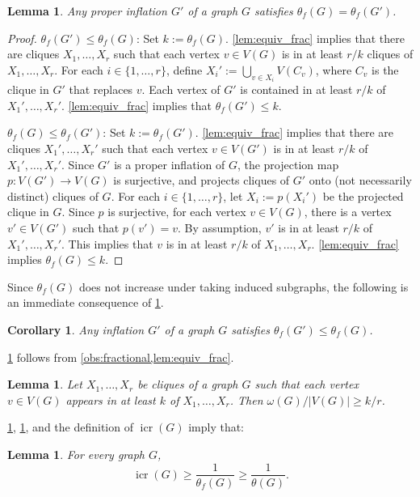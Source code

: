 \documentclass[11pt]{article}
\numberwithin{equation}{section}
\theoremstyle{plain}
\newtheorem{lem}[equation]{Lemma}
\newtheorem{cor}[equation]{Corollary}
\theoremstyle{definition}
\renewcommand{\geq}{\geqslant}
\renewcommand{\leq}{\leqslant}
\DeclareMathOperator{\icr}{icr}
\begin{document}
\begin{lem}
    \label{lem:inflation_frac}
    Any proper inflation $G'$ of a graph $G$ satisfies $\theta_f(G) = \theta_f(G')$.
\end{lem}
\begin{proof}
    $\theta_f(G') \leq \theta_f(G)$: Set $k:=\theta_f(G)$. \cref{lem:equiv_frac} implies that there are cliques $X_1, \dots, X_{r}$ such that each vertex $v \in V(G)$ is in at least $r/k$ cliques of $X_1, \dots, X_{r}$. For each $i \in \{1, \dots, r\}$, define $
        X_i':= \bigcup_{v \in X_i} V(C_v)$,
    where $C_v$ is the clique in $G'$ that replaces $v$. Each vertex of $G'$ is contained in at least $r/k$ of $X_1', \dots, X_r'$. \cref{lem:equiv_frac} implies that $\theta_f(G') \leq k$.

    $\theta_f(G) \leq \theta_f(G')$: Set $k:=\theta_f(G')$. \cref{lem:equiv_frac} implies that there are cliques $X_1', \dots, X_r'$ such that each vertex $v \in V(G')$ is in at least $r/k$ of $X_1', \dots, X_r'$. Since $G'$ is a proper inflation of $G$, the projection map $p: V(G') \to V(G)$ is surjective, and projects cliques of $G'$ onto (not necessarily distinct) cliques of $G$. For each $i \in \{1, \dots, r\}$, let $X_i:= p(X_i')$ be the projected clique in $G$. Since $p$ is surjective, for each vertex $v \in V(G)$, there is a vertex $v' \in V(G')$ such that $p(v') = v$. By assumption, $v'$ is in at least $r/k$ of $X_1', \dots, X_r'$. This implies that $v$ is in at least $r/k$ of $X_1, \dots, X_r$. \cref{lem:equiv_frac} implies $\theta_f(G) \leq k$.
\end{proof}
Since $\theta_f(G)$ does not increase under taking induced subgraphs, the following is an immediate consequence of \cref{lem:inflation_frac}.
\begin{cor}
    \label{cor:inflation_frac}
    Any inflation $G'$ of a graph $G$ satisfies $\theta_f(G') \leq \theta_f(G)$.
\end{cor}
\cref{lem:jofre_lemma} follows from \cref{obs:fractional,lem:equiv_frac}.
\begin{lem}
    \label{lem:jofre_lemma}
    Let $X_1, \dots, X_r$ be cliques of a graph $G$ such that each vertex $v \in V(G)$ appears in at least $k$ of $X_1, \dots, X_r$. Then $\omega(G)/ |V(G)| \geq k/r$.
\end{lem}
\cref{cor:inflation_frac}, \cref{lem:jofre_lemma}, and the definition of $\icr(G)$ imply that:
\begin{lem}
    \label{lem:clique_cover}
    For every graph $G$,
    \begin{equation*}
        \icr(G) \geq \frac{1}{\theta_f(G)} \geq \frac{1}{\theta(G)}.
    \end{equation*}
\end{lem}
\end{document}
